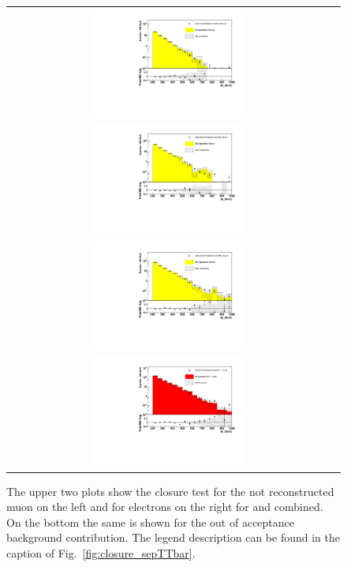 \begin{figure}[tbhn]
\begin{center}
\begin{tabular}{cc}
\includegraphics[width=0.50\textwidth]{lostlepton/plots/closure/MCClosureRecoMuMHT.pdf}
\includegraphics[width=0.50\textwidth]{lostlepton/plots/closure/MCClosureRecoEMHT.pdf}\\
\includegraphics[width=0.50\textwidth]{lostlepton/plots/closure/MCClosureAccMuMHT.pdf}
\includegraphics[width=0.50\textwidth]{lostlepton/plots/closure/MCClosureAccEMHT.pdf}\\
\end{tabular}
\end{center}
\caption{The upper two plots show the closure test for the not reconstructed muon on the left and for electrons on the right for \ttbar and \wpj combined. On the bottom the same is shown for the out of acceptance background contribution. The legend description can be found in the caption of Fig.~\ref{fig:closure_sepTTbar}.
}
\label{fig:reco_acc_combined}
\end{figure}

